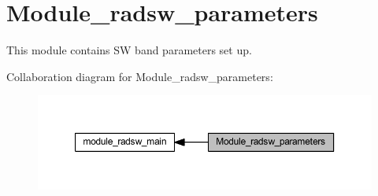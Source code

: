 \hypertarget{group__module__radsw__parameters}{}\section{Module\+\_\+radsw\+\_\+parameters}
\label{group__module__radsw__parameters}


This module contains SW band parameters set up.  


Collaboration diagram for Module\+\_\+radsw\+\_\+parameters\+:\nopagebreak
\begin{figure}[H]
\begin{center}
\leavevmode
\includegraphics[width=350pt]{group__module__radsw__parameters}
\end{center}
\end{figure}

